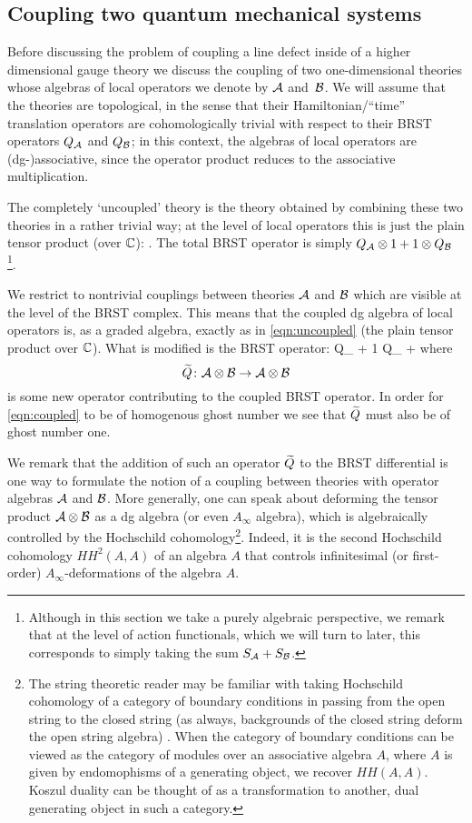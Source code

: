 \documentclass[11pt]{amsart}
\begin{document}
\subsection{Coupling two quantum mechanical systems} 

Before discussing the problem of coupling a line defect inside of a higher dimensional gauge theory we discuss the coupling of two one-dimensional theories whose algebras of local operators we denote by $\mathcal A$ and~$\mathcal B$. We will assume that the theories are topological, in the sense that their Hamiltonian/``time'' translation operators are cohomologically trivial with respect to their BRST operators $Q_\mathcal A$ and $Q_\mathcal B$; in this context, the algebras of local operators are (dg-)associative, since the operator product reduces to the associative multiplication. 

The completely `uncoupled' theory is the theory obtained by combining these two 
theories in a rather trivial way; at the level of local operators this is just the plain tensor product (over $\mathbb C$):
\beqn\label{eqn:uncoupled}
\cA \otimes \cB .
\eeqn
The total BRST operator is simply $Q_\mathcal A \otimes 1 + 1 \otimes Q_\mathcal B$ \footnote{Although in this section we take a purely algebraic perspective, we remark that at the level of action functionals, which we will turn to later, this corresponds to simply taking the sum $S_{\mathcal A} + S_{\mathcal B}$.}.

We restrict to nontrivial couplings between theories $\mathcal A$ and $\mathcal B$ which are visible at the level of the BRST complex. 
This means that the coupled dg algebra of local operators is, as a graded algebra, exactly as in \eqref{eqn:uncoupled} (the plain tensor product over $\mathbb C$). 
What is modified is the BRST operator: 
\beqn\label{eqn:coupled}
Q_{\cA}  + 1 \otimes Q_{\cB} + 
\eeqn
where 
\[
\widetilde{Q} \colon \mathcal A \otimes \mathcal B \to \mathcal A \otimes \mathcal B
\]
is some new operator contributing to the coupled BRST operator. 
In order for \eqref{eqn:coupled} to be of homogenous ghost number we see that $\widetilde{Q}$ must also be of ghost number one.

We remark that the addition of such an operator $\widetilde{Q}$ to the BRST differential is one way to formulate the notion of a coupling between theories with operator algebras $\mathcal A$ and $\mathcal B$. 
More generally, one can speak about deforming the tensor product $\mathcal A \otimes \mathcal B$ as a dg algebra (or even $A_\infty$ algebra), which is algebraically controlled by the Hochschild cohomology\footnote{The string theoretic reader may be familiar with taking Hochschild cohomology of a category of boundary conditions in passing from the open string to the closed string (as always, backgrounds of the closed string deform the open string algebra) \cite{DBranesmirror}. When the category of boundary conditions can be viewed as the category of modules over an associative algebra $A$, where $A$ is given by endomophisms of a generating object, we recover $HH(A, A)$. Koszul duality can be thought of as a transformation to another, dual generating object in such a category.}. 
Indeed, it is the second Hochschild cohomology $HH^2(A,A)$ of an algebra $A$ that controls infinitesimal (or first-order) $A_\infty$-deformations of the algebra $A$. 
\end{document}

